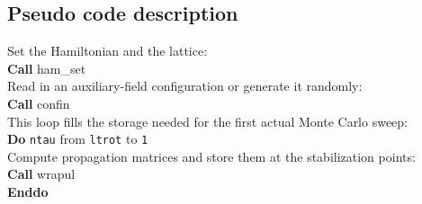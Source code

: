 %
\subsection{Pseudo code description}\label{sec:pseudocode}
%
\begin{mdframed}[frametitle={Basic structure of the auxiliary-field QMC implementation (\path{Prog/main.F90}):}]
{\setlength{\parindent}{0pt}
Set the Hamiltonian and the lattice:\\
\textbf{Call} ham\_set\\
Read in an auxiliary-field configuration or generate it randomly:\\
\textbf{Call} confin\\

This loop fills the storage needed for the first actual Monte Carlo sweep:\\
\textbf{Do} \texttt{ntau} from  \texttt{ltrot} to \texttt{1}\\
\hspace*{1em} Compute propagation matrices and store them at the stabilization points:\\
\hspace*{1em} \textbf{Call} wrapul\\
\textbf{Enddo}\\
 
}
\end{mdframed}

